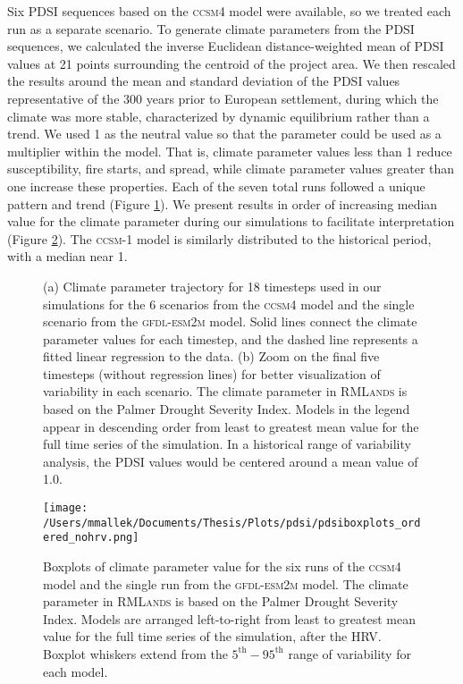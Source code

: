 \documentclass[12pt]{article}
\begin{document}
\begin{spacing}{1}
Six PDSI sequences based on the \textsc{ccsm4} model were available, so we treated each run as a separate scenario. To generate climate parameters from the PDSI sequences, we calculated the inverse Euclidean distance-weighted mean of PDSI values at 21 points surrounding the centroid of the project area. We then rescaled the results around the mean and standard deviation of the PDSI values representative of the 300 years prior to European settlement, during which the climate was more stable, characterized by dynamic equilibrium rather than a trend. We used 1 as the neutral value so that the parameter could be used as a multiplier within the model. That is, climate parameter values less than 1 reduce susceptibility, fire starts, and spread, while climate parameter values greater than one increase these properties. Each of the seven total runs followed a unique pattern and trend (Figure \ref{fig:pdsi_future}). We present results in order of increasing median value for the climate parameter during our simulations to facilitate interpretation (Figure \ref{pdsi-boxplots}). The \textsc{ccsm-1} model is similarly distributed to the historical period, with a median near 1.


\begin{figure}[!htbp]
\centering
	\caption{(a) Climate parameter trajectory for 18 timesteps used in our simulations for the 6 scenarios from the \textsc{ccsm4} model and the single scenario from the \textsc{gfdl-esm2m} model. Solid lines connect the climate parameter values for each timestep, and the dashed line represents a fitted linear regression to the data. (b) Zoom on the final five timesteps (without regression lines) for better visualization of variability in each scenario. The climate parameter in \textsc{RMLands} is based on the Palmer Drought Severity Index. Models in the legend appear in descending order from least to greatest mean value for the full time series of the simulation. In a historical range of variability analysis, the PDSI values would be centered around a mean value of 1.0.}
\label{fig:pdsi_future}

\end{figure}

\begin{figure}[!htbp]
\centering
\texttt{[image: /Users/mmallek/Documents/Thesis/Plots/pdsi/pdsiboxplots\_ordered\_nohrv.png]}
\caption{Boxplots of climate parameter value for the six runs of the \textsc{ccsm4} model and the single run from the \textsc{gfdl-esm2m} model.  The climate parameter in \textsc{RMLands} is based on the Palmer Drought Severity Index. Models are arranged left-to-right from least to greatest mean value for the full time series of the simulation, after the HRV. Boxplot whiskers extend from the $5^{\text{th}}-95^{\text{th}}$ range of variability for each model.}
\label{pdsi-boxplots}
\end{figure}



\end{spacing}
\end{document}
